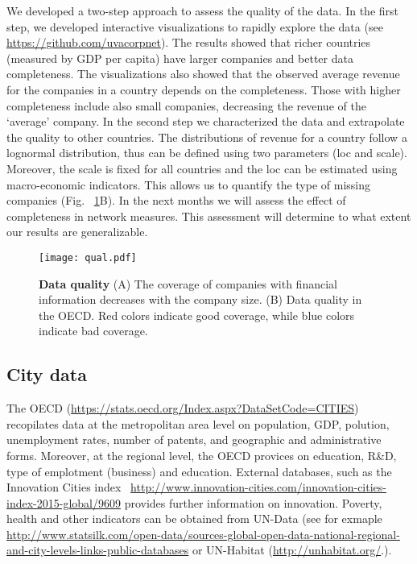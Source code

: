 We developed a two-step approach to assess the quality of the data. In the first step, we developed interactive visualizations to rapidly explore the data (see \url{https://github.com/uvacorpnet}). The results showed that richer countries (measured by GDP per capita) have larger companies and better data completeness. 
The visualizations also showed that the observed average revenue for the companies in a country depends on the completeness. 
Those with higher completeness include also small companies, 
decreasing the revenue of the `average' company. 
In the second step we characterized the data and extrapolate the quality to other countries. 
The distributions of revenue for a country follow a lognormal distribution, 
thus can be defined using two parameters (loc and scale). 
Moreover, the scale is fixed for all countries and the loc can be estimated using macro-economic indicators. 
This allows us to quantify the type of missing companies (Fig. ~\ref{fig:qual}B). 
In the next months we will assess the effect of completeness in network measures. 
This assessment will determine to what extent our results are generalizable. 

\begin{figure}
\begin{center}
\texttt{[image: qual.pdf]}
\caption{\textbf{Data quality} (A) The coverage of companies with financial information decreases with the company size. (B) Data quality in the OECD. Red colors indicate good coverage, while blue colors indicate bad coverage.}
\label{fig:qual}
\end{center}
\end{figure}



\subsection{City data}
The OECD (\url{https://stats.oecd.org/Index.aspx?DataSetCode=CITIES}) recopilates data at the metropolitan area level on population, GDP, polution, unemployment rates, number of patents, and geographic and administrative forms.
Moreover, at the regional level, 
the OECD provices on education, R&D, type of emplotment (business) and education.
External databases, such as the Innovation Cities index ~\url{http://www.innovation-cities.com/innovation-cities-index-2015-global/9609} provides further information on innovation.
Poverty, health and other indicators can be obtained from UN-Data (see for exmaple \url{http://www.statsilk.com/open-data/sources-global-open-data-national-regional-and-city-levels-links-public-databases} or UN-Habitat (\url{http://unhabitat.org/}.\cite{leautier2006cities}).

